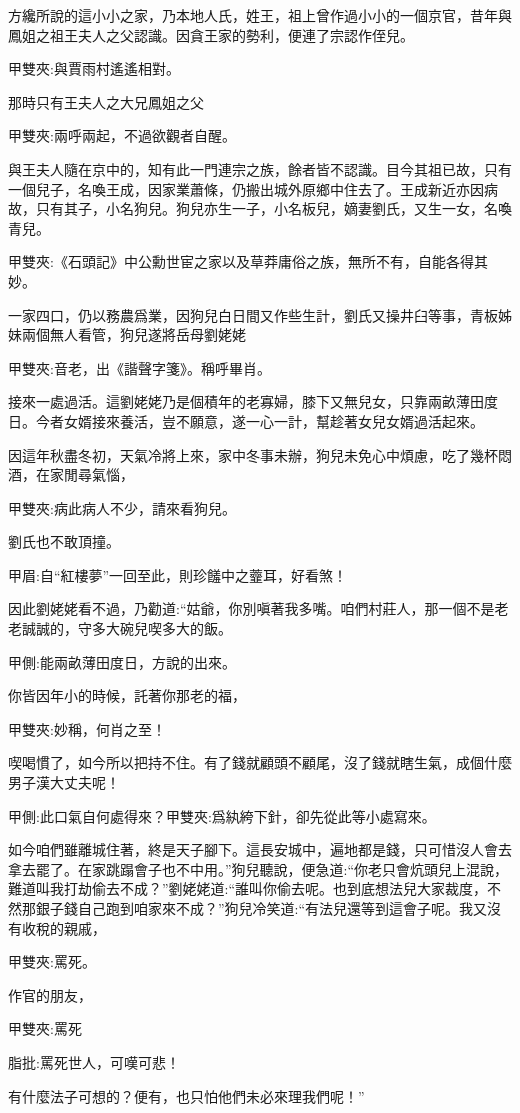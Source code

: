 \begin{parag}
    方纔所說的這小小之家，乃本地人氏，姓王，祖上曾作過小小的一個京官，昔年與鳳姐之祖王夫人之父認識。因貪王家的勢利，便連了宗認作侄兒。\begin{note}甲雙夾:與賈雨村遙遙相對。\end{note}那時只有王夫人之大兄鳳姐之父\begin{note}甲雙夾:兩呼兩起，不過欲觀者自醒。\end{note}與王夫人隨在京中的，知有此一門連宗之族，餘者皆不認識。目今其祖已故，只有一個兒子，名喚王成，因家業蕭條，仍搬出城外原鄉中住去了。王成新近亦因病故，只有其子，小名狗兒。狗兒亦生一子，小名板兒，嫡妻劉氏，又生一女，名喚青兒。\begin{note}甲雙夾:《石頭記》中公勳世宦之家以及草莽庸俗之族，無所不有，自能各得其妙。\end{note}一家四口，仍以務農爲業，因狗兒白日間又作些生計，劉氏又操井臼等事，青板姊妹兩個無人看管，狗兒遂將岳母劉姥姥\begin{note}甲雙夾:音老，出《諧聲字箋》。稱呼畢肖。\end{note}接來一處過活。這劉姥姥乃是個積年的老寡婦，膝下又無兒女，只靠兩畝薄田度日。今者女婿接來養活，豈不願意，遂一心一計，幫趁著女兒女婿過活起來。
\end{parag}


\begin{parag}
    因這年秋盡冬初，天氣冷將上來，家中冬事未辦，狗兒未免心中煩慮，吃了幾杯悶酒，在家閒尋氣惱，\begin{note}甲雙夾:病此病人不少，請來看狗兒。\end{note}劉氏也不敢頂撞。\begin{note}甲眉:自“紅樓夢”一回至此，則珍饈中之虀耳，好看煞！\end{note}因此劉姥姥看不過，乃勸道:“姑爺，你別嗔著我多嘴。咱們村莊人，那一個不是老老誠誠的，守多大碗兒喫多大的飯。\begin{note}甲側:能兩畝薄田度日，方說的出來。\end{note}你皆因年小的時候，託著你那老的福，\begin{note}甲雙夾:妙稱，何肖之至！\end{note}喫喝慣了，如今所以把持不住。有了錢就顧頭不顧尾，沒了錢就瞎生氣，成個什麼男子漢大丈夫呢！\begin{note}甲側:此口氣自何處得來？甲雙夾:爲紈絝下針，卻先從此等小處寫來。\end{note}如今咱們雖離城住著，終是天子腳下。這長安城中，遍地都是錢，只可惜沒人會去拿去罷了。在家跳蹋會子也不中用。”狗兒聽說，便急道:“你老只會炕頭兒上混說，難道叫我打劫偷去不成？”劉姥姥道:“誰叫你偷去呢。也到底想法兒大家裁度，不然那銀子錢自己跑到咱家來不成？”狗兒冷笑道:“有法兒還等到這會子呢。我又沒有收稅的親戚，\begin{note}甲雙夾:罵死。\end{note}作官的朋友，\begin{note}甲雙夾:罵死\end{note}\begin{note}脂批:罵死世人，可嘆可悲！\end{note}有什麼法子可想的？便有，也只怕他們未必來理我們呢！”
\end{parag}


